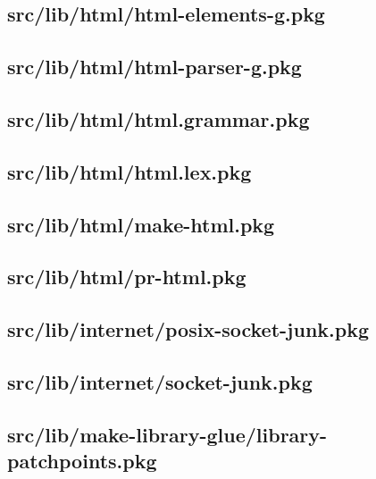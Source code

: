 \subsection{src/lib/html/html-elements-g.pkg}


\subsection{src/lib/html/html-parser-g.pkg}


\subsection{src/lib/html/html.grammar.pkg}


\subsection{src/lib/html/html.lex.pkg}


\subsection{src/lib/html/make-html.pkg}


\subsection{src/lib/html/pr-html.pkg}


\subsection{src/lib/internet/posix-socket-junk.pkg}


\subsection{src/lib/internet/socket-junk.pkg}


\subsection{src/lib/make-library-glue/library-patchpoints.pkg}


